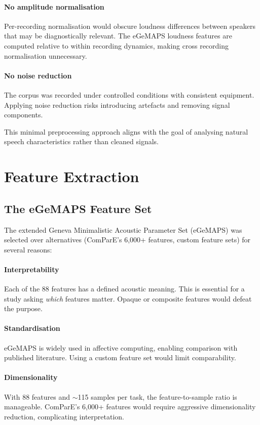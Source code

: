 \paragraph{No amplitude normalisation} Per-recording normalisation would obscure loudness differences between speakers that may be diagnostically relevant. The eGeMAPS loudness features are computed relative to within recording dynamics, making cross recording normalisation unnecessary.

\paragraph{No noise reduction} The corpus was recorded under controlled conditions with consistent equipment. Applying noise reduction risks introducing artefacts and removing signal components.

This minimal preprocessing approach aligns with the goal of analysing natural speech characteristics rather than cleaned signals.

\section{Feature Extraction}

\subsection{The eGeMAPS Feature Set}

The extended Geneva Minimalistic Acoustic Parameter Set (eGeMAPS) \cite{Eyben2016} was selected over alternatives (ComParE's 6,000+ features, custom feature sets) for several reasons:

\paragraph{Interpretability} Each of the 88 features has a defined acoustic meaning. This is essential for a study asking \textit{which} features matter. Opaque or composite features would defeat the purpose.

\paragraph{Standardisation} eGeMAPS is widely used in affective computing, enabling comparison with published literature. Using a custom feature set would limit comparability.

\paragraph{Dimensionality} With 88 features and $\sim$115 samples per task, the feature-to-sample ratio is manageable. ComParE's 6,000+ features would require aggressive dimensionality reduction, complicating interpretation.

